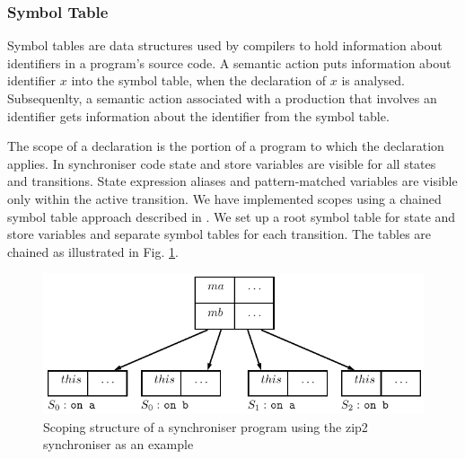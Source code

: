 


  \subsubsection{Symbol Table}
Symbol tables are data structures used by compilers to hold information about identifiers in a program's source code. A semantic action puts information about identifier $x$ into the symbol table, when the declaration of $x$ is analysed. Subsequenlty, a semantic action associated with a production that involves an identifier gets information about the identifier from the symbol table.

The scope of a declaration is the portion of a program to which the declaration applies. In synchroniser code state and store variables are visible for all states and transitions. State expression aliases and pattern-matched variables are visible only within the active transition. We have implemented scopes using a chained symbol table approach described in \cite{dragonbook}. We set up a root symbol table for state and store variables and separate symbol tables for each transition. The tables are chained as illustrated in Fig. \ref{fig:symtab_chain}.

  \begin{figure}[h!]
  \centering
  \includegraphics{figs/chapter_02_symtab_chain.pdf}
  \caption{Scoping structure of a synchroniser program using the zip2 synchroniser as an example}
  \label{fig:symtab_chain}
  \end{figure}

